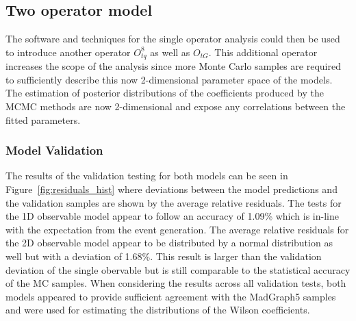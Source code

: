 \documentclass[a4paper,11pt]{article}
\begin{document}
\subsection{Two operator model}\label{sec:analysis_two_op}

The software and techniques for the single operator analysis could then be used to introduce another operator $O_{tq}^{8}$ as well as $O_{tG}$.
This additional operator increases the scope of the analysis since more Monte Carlo samples are required to sufficiently describe this now 2-dimensional parameter space of the models.
The estimation of posterior distributions of the coefficients produced by the MCMC methods are now 2-dimensional and expose any correlations between the fitted parameters.

\subsubsection{Model Validation}

The results of the validation testing for both models can be seen in Figure~\ref{fig:residuals_hist} where deviations between the model predictions and the validation samples are shown by the average relative residuals.
The tests for the 1D observable model appear to follow an accuracy of 1.09\% which is in-line with the expectation from the event generation.
The average relative residuals for the 2D observable model appear to be distributed by a normal distribution as well but with a deviation of 1.68\%.
This result is larger than the validation deviation of the single obervable but is still comparable to the statistical accuracy of the MC samples.
When considering the results across all validation tests, both models appeared to provide sufficient agreement with the MadGraph5 samples and were used for estimating the distributions of the Wilson coefficients.
\end{document}

